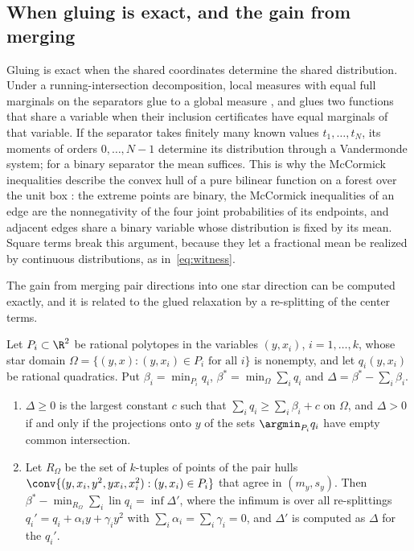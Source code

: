 \subsection{When gluing is exact, and the gain from merging}\label{sec:gluing}

Gluing is exact when the shared coordinates determine the shared
distribution. Under a running-intersection decomposition, local measures
with equal full marginals on the separators glue to a global measure
\citep{Vorobev1962,Lasserre2006}, and \citet[Corollary~3.10]{Tawarmalani2010}
glues two functions that share a variable when their inclusion certificates
have equal marginals of that variable. If the separator takes finitely many
known values $t_1,\dots,t_N$, its moments of orders $0,\dots,N-1$ determine
its distribution through a Vandermonde system; for a binary separator the
mean suffices. This is why the McCormick inequalities describe the convex
hull of a pure bilinear function on a forest over the unit box
\citep[Proposition~8]{Padberg1989}: the extreme points are binary, the
McCormick inequalities of an edge are the nonnegativity of the four joint
probabilities of its endpoints, and adjacent edges share a binary variable
whose distribution is fixed by its mean. Square terms break this argument,
because they let a fractional mean be realized by continuous distributions,
as in~\eqref{eq:witness}.

The gain from merging pair directions into one star direction can be
computed exactly, and it is related to the glued relaxation by a
re-splitting of the center terms.

\begin{proposition}\label{prop:gain}
Let $P_i\subset\R^2$ be rational polytopes in the variables $(y,x_i)$,
$i=1,\dots,k$, whose star domain $\Omega=\{(y,x):(y,x_i)\in P_i\text{ for all }i\}$
is nonempty, and let $q_i(y,x_i)$ be rational quadratics. Put
$\beta_i=\min_{P_i}q_i$, $\beta^\ast=\min_\Omega\sum_iq_i$ and
$\Delta=\beta^\ast-\sum_i\beta_i$.
\begin{enumerate}[label=(\roman*)]
\item $\Delta\ge0$ is the largest constant $c$ such that
$\sum_iq_i\ge\sum_i\beta_i+c$ on $\Omega$, and $\Delta>0$ if and only if the
projections onto $y$ of the sets $\argmin_{P_i}q_i$ have empty common
intersection.
\item Let $R_\Omega$ be the set of $k$-tuples of points of the pair hulls
$\conv\{(y,x_i,y^2,yx_i,x_i^2):(y,x_i)\in P_i\}$ that agree in $(m_y,s_y)$.
Then $\beta^\ast-\min_{R_\Omega}\sum_i\operatorname{lin}q_i=\inf\Delta'$, where
the infimum is over all re-splittings $q_i'=q_i+\alpha_iy+\gamma_iy^2$ with
$\sum_i\alpha_i=\sum_i\gamma_i=0$, and $\Delta'$ is computed as $\Delta$ for
the $q_i'$.
\end{enumerate}
\end{proposition}

